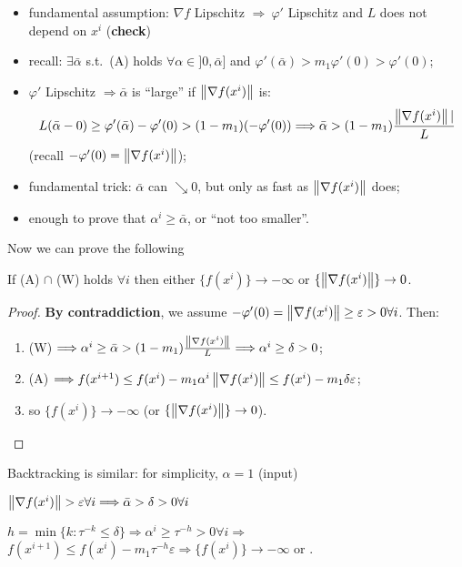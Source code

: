 \documentclass[ComputationalMathematics.tex]{subfiles}
\begin{document}
\begin{itemize}
 \item fundamental assumption: $\nabla f$ Lipschitz $\Longrightarrow ~ \varphi'$ Lipschitz and $L$ does not depend on $x^i$ ({\bf check})
 \item recall: $\exists \bar{\alpha}$ s.t.~(A) holds $\forall \alpha \in ]0, \bar{\alpha}]$ and $\varphi'(\bar{\alpha}) > m_1 \varphi'(0) > \varphi'(0)$;
 \item $\varphi'$ Lipschitz $\Longrightarrow \bar{\alpha}$ is ``large'' if $\left\lVert\nabla f(x^i)\right\rVert$ is: 
   \[
     L(\bar{\alpha} - 0) \geq \varphi'(\bar{\alpha}) - \varphi'(0)
        > (1 - m_1) (- \varphi'(0)) \Longrightarrow 
        \bar{\alpha} > (1 - m_1) \frac{\left\lVert\nabla f(x^i)\right\rVert|}{L}
  \]
       (recall $- \varphi'(0) = \left\lVert\nabla f(x^i)\right\rVert$);
 \item fundamental trick: $\bar{\alpha}$ can $\searrow 0$, but only as fast as $\left\lVert\nabla f(x^i)\right\rVert$ does;
 \item enough to prove that $\alpha^i \geq \bar{\alpha}$, or ``not too smaller''.
\end{itemize}

Now we can prove the following

\begin{theorem}
  If (A) $\cap$ (W) holds $\forall i$ then either $\{f(x^i)\} \to -\infty$ or $ \{\left\lVert\nabla f(x^i)\right\rVert\} \to 0$. 
\end{theorem}

\begin{proof}
  \textbf{By contraddiction}, we assume $- \varphi'(0) = \left\lVert\nabla f(x^i)\right\rVert \geq \varepsilon > 0 \forall i$. Then:
  \begin{enumerate}
    \item (W) $\Longrightarrow \alpha^i \geq \bar{\alpha} > (1 - m_1) \frac{\left\lVert\nabla f(x^i)\right\rVert}{L} \Longrightarrow \alpha^i \geq \delta > 0$;
    \item (A) $\Longrightarrow f(x^{i+1}) \leq f(x^i) - m_1 \alpha^i \left\lVert\nabla f(x^i)\right\rVert \leq f(x^i) - m_1 \delta \varepsilon$;
    \item so $\{f(x^i)\} \to -\infty$ (or $ \{\left\lVert\nabla f(x^i)\right\rVert\} \to 0$).
  \end{enumerate}
\end{proof}

Backtracking is similar: for simplicity, $\alpha = 1$ (input)

      $\left\lVert\nabla f(x^i)\right\rVert > \varepsilon \forall i \Longrightarrow \bar{\alpha} > \delta > 0 \forall i$

      $h = \min \{k : \tau^{-k} \leq \delta\} \Longrightarrow \alpha^i \geq \tau^{-h} > 0 \forall i \Longrightarrow$ $f(x^{i+1}) \leq f(x^i) - m_1 \tau^{-h} \varepsilon \Longrightarrow \{f(x^i)\} \to -\infty$ or \faFlash.
\end{document}
